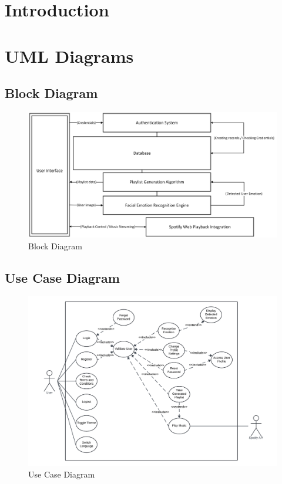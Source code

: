 \section{Introduction}
\section{UML Diagrams}
\subsection{Block Diagram}
\begin{figure}[!ht]
    \centering
    \includegraphics[width=12cm]{Images/block.png}
    \caption{Block Diagram}
    \label{fig:block}
\end{figure}
\subsection{Use Case Diagram}
\begin{figure}[!ht]
    \centering
    \includegraphics[width=14cm]{Images/usecase.png}
    \caption{Use Case Diagram}
    \label{fig:usecase}
\end{figure}
